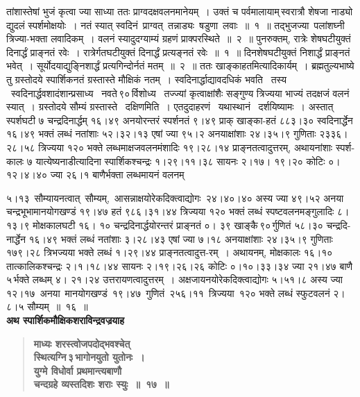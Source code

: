 \documentclass[11pt, openany]{book}
\begin{document}
\newpage

\noindent तांशास्तेषां भुजं कृत्वा ज्या साध्या ततः प्राग्वदक्षवलनमानेयम्~। उक्तं च {\color{violet}पर्वमालायाम्\textendash \,स्वरात्रौ \;शेषजा \;नाड्यो \;द्युदलं \;स्पर्शमोक्षयोः~। नतं \;स्यात् स्वदिनं \,प्राग्वत् \,तन्नाड्यः \,षडुणा \,लवाः~॥~१~॥ तद्भुजज्या \,पलांशघ्नी \,त्रिज्या-भक्ता लवादिकम्~। वलनं स्यादुदग्याम्यं ग्रहणं प्राक्परस्थिते~॥~२~॥} पुनरुक्तम्, {\color{violet}रात्रेः शेषघटीयुक्तं दिनार्द्धं प्राङ्नतं रवेः~। रात्रेर्गतघटीयुक्तं दिनार्द्धं प्रत्यङ्नतं रवेः~॥~१~॥ दिनशेषघटीयुक्तं निशार्द्धं प्राङ्नतं भवेत्~। सूर्योदयाद्युङ्निशार्द्धं प्रत्यगिन्दोर्नतं मतम्~॥~२~॥} ततः खाङ्काहतमित्यादिकार्यम्~। ब्रह्मतुल्यभाष्ये तु ग्रस्तोदये स्पार्शिकनतं ग्रस्तास्ते मौक्षिकं नतम्~। स्वदिनार्द्धाद्यावदधिकं भवति ~तस्य ~स्वदिनार्द्धवशादंशान्प्रसाध्य ~नवते\textendash \,९०\textendash \,र्विशोध्य ~तज्ज्यां कृत्वाक्षांशैः सङ्गुण्य त्रिज्यया भाज्यं तदक्षजं वलनं स्यात्~। ग्रस्तोदये सौम्यं ग्रस्तास्ते ~दक्षिणमिति~। एतदुदाहरणं ~यथास्थानं ~दर्शयिष्यामः~। अस्तात् स्पर्शघटी ७ चन्द्रदिनार्द्धम् १६।४९ अनयोरन्तरं स्पर्शनतं ९।४९ प्राक् खाङ्का-हतं ८८३।३० स्वदिनार्द्धेन १६।४९ भक्तं लब्धं नतांशाः ५२।३२।१३ एषां ज्या ९५।२ अनयाक्षांशाः २४।३५।९ गुणिताः २३३६।२८।५८ त्रिज्यया १२० भक्ते लब्धमाक्षजवलनमंशादिः १९।२८।१४ प्राङ्नतत्वादुत्तरम्, अथायनांशाः स्पर्श-कालः ७ यात्येष्यनाडीत्यादिना स्पार्शिकश्चन्द्रः १।२९।११।३८ सायनः २।१७। १९।२० कोटिः ०।१२।४।४० ज्या २६।१ बाणैर्भक्ता लब्धमायनं वलनम्

\newpage

\noindent ५।१३ \,सौम्यायनत्वात् \,सौम्यम्, \,आसन्नाक्षयोरेकदिक्त्वाद्योगः \,२४।४०।४० अस्य ज्या ४९।५२ अनया चन्द्रभूभामानयोगखण्डं १९।४७ हतं ९८६।३१।४४ त्रिज्यया १२० भक्तं लब्धं स्पष्टवलनमङ्गुलादिः ८।१३।९ मोक्षकालघटी १६। १० चन्द्रदिनार्द्धयोरन्तरं प्राङ्नतं ०। ३९ खाङ्कै\textendash \,९०\textendash \,र्गुणितं ५८।३० चन्द्रदि-नार्द्धेन १६।४९ भक्तं लब्धं नतांशाः ३।२८।४३ एषां ज्या ७।१८ अनयाक्षांशाः २४।३५।९ गुणिताः १७९।२८ त्रिभज्यया भक्ते लब्धं १।२९।४४ प्राङ्नतत्वादुत्त-रम्~। अथायनम्, मोक्षकालः १६।१० तात्कालिकश्चन्द्रः २।१।१८।४४ सायनः २।१९।२६।२६ कोटिः ०।१०।३३।३४ ज्या २१।४७ बाणै\textendash \,५\textendash \,र्भक्ते लब्धम् ४। २१।२४ उत्तरायणत्वादुत्तरम्~। अक्षजायनयोरेकदिक्त्वाद्योगः ५।५१।८ अस्य ज्या \,१२।१७ \,अनया \,मानयोगखण्डं \,१९।४७ \,गुणितं \,२५६।११ \,त्रिज्यया \,१२० भक्ते लब्धं स्फुटवलनं २।८।५ सौम्यम्~॥~१६~॥\\

{\small \textbf{अथ स्पार्शिकमौक्षिकशराविन्द्रवज्रयाह\textendash }}

 \label{4.17}
\begin{quote}
{\large \textbf{{\color{purple}माध्यः शरस्त्वोजपदोद्भवश्चेत् \\
स्थित्यग्नि\textendash \,३\textendash \,भागोनयुतो युतोनः~। \\
युग्मे विधोर्वा प्रथमान्त्यबाणौ \\
चन्दग्रहे व्यस्तदिशः शराः स्युः~॥~१७~॥}}}
\end{quote}
\end{document}
